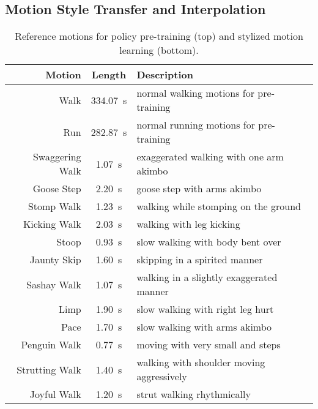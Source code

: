 \subsection{Motion Style Transfer and Interpolation}\label{sec:style_transfer}


\begin{table}[t]
    \centering\small 
    \caption{Reference motions for policy pre-training (top) and stylized motion learning (bottom).}
    \vspace{-8pt}
    \begin{tabular}{r|c|l}
        \toprule
        \textbf{Motion} & \textbf{Length} & \textbf{Description} \\
        \midrule
        Walk & 334.07~s & {\footnotesize normal walking motions for pre-training}\\
        Run & 282.87~s & {\footnotesize normal running motions for pre-training}\\
        \midrule
        Swaggering Walk & 1.07~s & {\footnotesize exaggerated walking with one arm akimbo} \\
        Goose Step & 2.20~s & {\footnotesize goose step with arms akimbo} \\
        Stomp Walk & 1.23~s & {\footnotesize walking while stomping on the ground} \\
        Kicking Walk & 2.03~s & {\footnotesize walking with leg kicking} \\ %
        Stoop & 0.93~s & {\footnotesize slow walking with body bent over} \\
        Jaunty Skip & 1.60~s & {\footnotesize skipping in a spirited manner} \\
        Sashay Walk & 1.07~s & {\footnotesize walking in a slightly exaggerated manner} \\
        Limp & 1.90~s & {\footnotesize slow walking with right leg hurt} \\
        Pace & 1.70~s & {\footnotesize slow walking with arms akimbo} \\
        Penguin Walk & 0.77~s & {\footnotesize moving with very small and steps} \\ %
        Strutting Walk & 1.40~s & {\footnotesize walking with shoulder moving aggressively } \\ %
        Joyful Walk & 1.20~s & {\footnotesize strut walking rhythmically} \\
        \bottomrule
    \end{tabular}
    \label{tab:motions}
\end{table}

